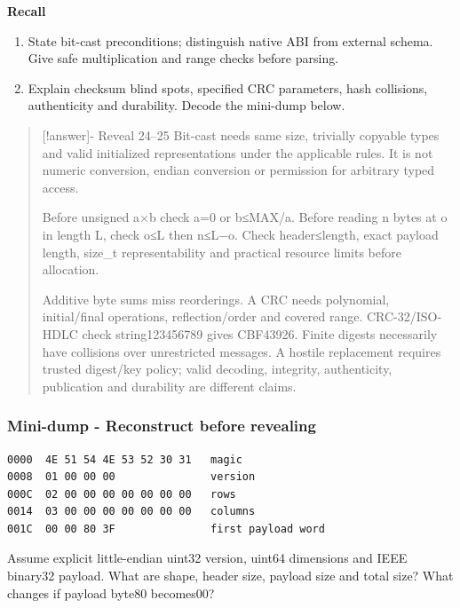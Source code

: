 \textbf{Recall}

\begin{enumerate}
\def\labelenumi{\arabic{enumi}.}
\setcounter{enumi}{23}
\tightlist
\item
  State bit-cast preconditions; distinguish native ABI from external schema. Give safe multiplication and range checks before parsing.
\item
  Explain checksum blind spots, specified CRC parameters, hash collisions, authenticity and durability. Decode the mini-dump below.
\end{enumerate}

\begin{quote}
{[}!answer{]}- Reveal 24--25 Bit-cast needs same size, trivially copyable types and valid initialized representations under the applicable rules. It is not numeric conversion, endian conversion or permission for arbitrary typed access.

Before unsigned a×b check a=0 or b≤MAX/a. Before reading n bytes at o in length L, check o≤L then n≤L−o. Check header≤length, exact payload length, size\_t representability and practical resource limits before allocation.

Additive byte sums miss reorderings. A CRC needs polynomial, initial/final operations, reflection/order and covered range. CRC-32/ISO-HDLC check string123456789 gives CBF43926. Finite digests necessarily have collisions over unrestricted messages. A hostile replacement requires trusted digest/key policy; valid decoding, integrity, authenticity, publication and durability are different claims.
\end{quote}

\subsubsection{Mini-dump - Reconstruct before revealing}\label{appendix-ef4d27797a92-mini-dump---reconstruct-before-revealing}

\begin{verbatim}
0000  4E 51 54 4E 53 52 30 31   magic
0008  01 00 00 00               version
000C  02 00 00 00 00 00 00 00   rows
0014  03 00 00 00 00 00 00 00   columns
001C  00 00 80 3F               first payload word
\end{verbatim}

Assume explicit little-endian uint32 version, uint64 dimensions and IEEE binary32 payload. What are shape, header size, payload size and total size? What changes if payload byte80 becomes00?

